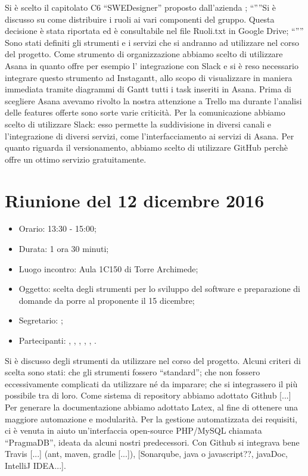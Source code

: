 Si è scelto il capitolato C6 “SWEDesigner” proposto dall'azienda \ZU; 
“””Si è discusso su come distribuire i ruoli ai vari componenti del gruppo. Questa decisione è stata riportata ed è consultabile nel file Ruoli.txt in Google Drive; “””
Sono stati definiti gli strumenti e i servizi che si andranno ad utilizzare nel corso del progetto. Come strumento di organizzazione abbiamo scelto di utilizzare Asana in quanto offre per esempio l' integrazione con Slack e si è reso necessario integrare questo strumento ad Instagantt, allo scopo di visualizzare in maniera immediata tramite diagrammi di Gantt tutti i task inseriti in Asana. Prima di scegliere Asana avevamo rivolto la nostra attenzione a Trello ma durante l'analisi delle features offerte sono sorte varie criticità. Per la comunicazione abbiamo scelto di utilizzare Slack: esso permette la suddivisione in diversi canali e l'integrazione di diversi servizi, come l'interfacciamento ai servizi di Asana. Per quanto riguarda il versionamento, abbiamo scelto di utilizzare  GitHub perchè offre un ottimo servizio gratuitamente.



\section{Riunione del 12 dicembre 2016}

\begin{itemize}
	\item Orario: 13:30 - 15:00;
	\item Durata: 1 ora 30 minuti;
	\item Luogo incontro: Aula 1C150 di Torre Archimede; 
	\item Oggetto: scelta degli strumenti per lo sviluppo del software e preparazione di domande da porre al proponente il 15 dicembre;
	\item Segretario: \PB; 
	\item Partecipanti: \AZ, \GG, \LB, \LS, \MM, \PB.
\end{itemize}

Si è discusso degli strumenti da utilizzare nel corso del progetto. Alcuni criteri di scelta sono stati: che gli strumenti fossero “standard”; che non fossero eccessivamente complicati da utilizzare né da imparare; che si integrassero il più possibile tra di loro. Come sistema di repository abbiamo adottato Github [...] Per generare la documentazione abbiamo adottato Latex, al fine di ottenere una maggiore automazione e modularità. Per la gestione automatizzata dei requisiti, ci è venuta in aiuto un'interfaccia open-source PHP/MySQL chiamata “PragmaDB”, ideata da alcuni nostri predecessori. Con Github si integrava bene Travis [...] (ant, maven, gradle [...]), [Sonarqube, java o javascript??, javaDoc, IntelliJ IDEA...].


